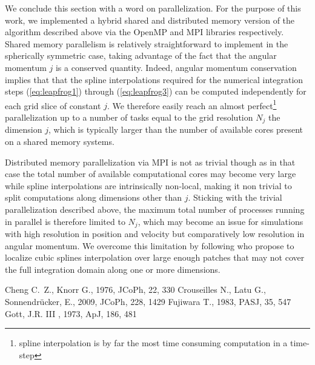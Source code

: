 \documentclass[useAMS,usenatbib]{mn2e}
\begin{document}
We conclude this section with a word on parallelization. For the purpose of this work, we implemented a hybrid shared and distributed memory version of the algorithm described above via the OpenMP and MPI libraries respectively. Shared memory parallelism is relatively straightforward to implement in the spherically symmetric case, taking advantage of the fact that the angular momentum $j$ is a conserved quantity. Indeed, angular momentum conservation implies that that the spline interpolations required for the numerical integration steps (\ref{eq:leapfrog1}) through (\ref{eq:leapfrog3}) can be computed independently for each grid slice of constant $j$. We therefore easily reach an almost perfect\footnote{spline interpolation is by far the most time consuming computation in a time-step} parallelization up to a number of tasks equal to the grid resolution $N_j$ the dimension $j$, which is typically larger than the number of available cores present on a shared memory systems. 

Distributed memory parallelization via MPI is not as trivial though as in that case the total number of available computational cores may become very large while spline interpolations are intrinsically non-local, making it non trivial to split computations along dimensions other than $j$. Sticking with the trivial parallelization described above, the maximum total number of processes running in parallel is therefore limited to $N_j$, which may become an issue for simulations with high resolution in position and velocity but comparatively low resolution in angular momentum. We overcome this limitation by following \cite{Crouseilles09} who propose to localize cubic splines interpolation over large enough patches that may not cover the full integration domain along one or more dimensions.

\begin{thebibliography}{}
  Cheng C.~Z., Knorr G., 1976, JCoPh, 22, 330 
  Crouseilles N., Latu G., Sonnendr\"{u}cker, E., 2009, JCoPh, 228, 1429  
  Fujiwara T., 1983, PASJ, 35, 547 
  Gott, J.R. III , 1973, ApJ, 186, 481 
\end{thebibliography}
\label{lastpage}
\end{document}
